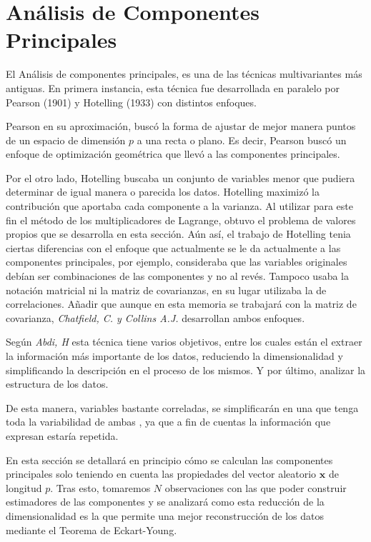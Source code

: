 \newpage
\section{Análisis de Componentes Principales}
\noindent El Análisis de componentes principales, es una de las técnicas multivariantes más antiguas. En primera instancia, esta técnica fue desarrollada en paralelo por Pearson (1901) y Hotelling (1933) \cite{Jollife 1986} con distintos enfoques. 

\noindent Pearson en su aproximación, buscó la forma de ajustar de mejor manera puntos de un espacio de dimensión $p$ a una recta o plano. Es decir, Pearson buscó un enfoque de optimización geométrica que llevó a las componentes principales.

\noindent Por el otro lado, Hotelling buscaba un conjunto de variables menor que pudiera determinar de igual manera o parecida los datos. Hotelling maximizó la contribución que aportaba cada componente a la varianza. Al utilizar para este fin el método de los multiplicadores de Lagrange, obtuvo el problema de valores propios que se desarrolla en esta sección. Aún así, el trabajo de Hotelling tenia ciertas diferencias con el enfoque que actualmente se le da actualmente a las componentes principales, por ejemplo, consideraba que las variables originales  debían ser combinaciones de las componentes y no al revés. Tampoco usaba la notación matricial ni la matriz de covarianzas, en su lugar utilizaba la de correlaciones. Añadir que aunque en esta memoria se trabajará con la matriz de covarianza, \emph{Chatfield, C. y Collins A.J.}\cite{Chatfield 1989} desarrollan ambos enfoques. 

\noindent Según \emph{Abdi, H} \cite{Abdi 2010} esta técnica tiene varios objetivos, entre los cuales están el extraer la información más importante de los datos, reduciendo la dimensionalidad y simplificando la descripción en el proceso de los mismos. Y por último, analizar la estructura de los datos. 


\noindent De esta manera, variables bastante correladas, se simplificarán en una que tenga toda la variabilidad de ambas \cite{Chatfield 1989}, \cite{Everitt 2011} ya que a fin de cuentas la información que expresan estaría repetida. 

\noindent En esta sección se detallará en principio cómo se calculan las componentes principales solo teniendo en cuenta las propiedades del vector aleatorio $\mathbf{x}$ de longitud $p$. Tras esto, tomaremos $N$ observaciones con las que poder construir estimadores de las componentes y se analizará como esta reducción de la dimensionalidad es la que permite una mejor reconstrucción de los datos mediante el Teorema de Eckart-Young. 

